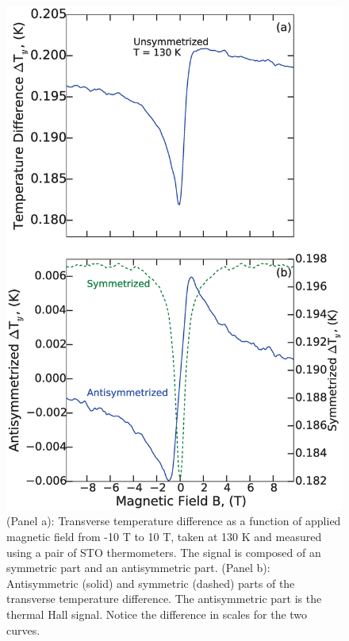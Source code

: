 \documentclass{thesis-umich}
\begin{document}
\begin{figure}\centering \caption[Transverse Temperature Gradient of a Bismuth Crystal]{(Panel a): Transverse temperature difference as a
    function of applied magnetic field from -10 T to 10 T, taken at 130 K and
    measured using a pair of STO thermometers. The signal is composed of an
    symmetric part and an antisymmetric part.  (Panel b): Antisymmetric (solid)
  and symmetric (dashed) parts of the transverse temperature difference. The
antisymmetric part is the thermal Hall signal. Notice the difference in scales
for the two curves.} \label{fig:t_grad}
\centering
\includegraphics[width=0.85\columnwidth]{figures/rawCurve_apl.eps} \end{figure}
\end{document}
